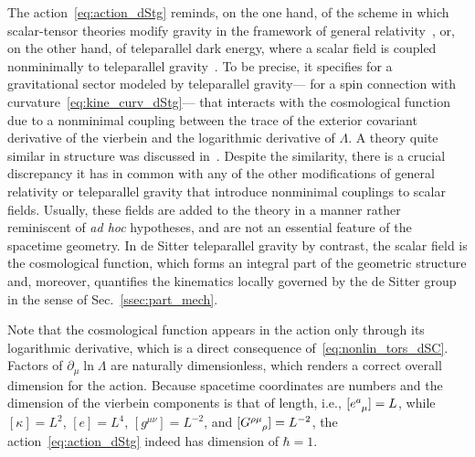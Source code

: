 \documentclass[%
aps,
prd,
reprint
]{revtex4-1}
\newcommand{\ind}{\indices}
\def\pd{\partial}
\begin{document}
The action~\eqref{eq:action_dStg} reminds, on the one hand, of 
the scheme in which scalar-tensor theories modify gravity in the 
framework of general relativity~\cite{Brans:1961sx, Dicke:1961gz, 
  Bergmann:1968ve, Sotiriou:2008rp, Tsujikawa:2010zza}, or, on 
the other hand, of teleparallel dark energy, where a scalar field 
is coupled nonminimally to teleparallel 
gravity~\cite{Geng:2011aj, Geng:2011ka, Xu:2012jf}. To be 
precise, it specifies for a gravitational sector modeled by 
teleparallel gravity--- for a spin connection with 
curvature~\eqref{eq:kine_curv_dStg}--- that interacts with the 
cosmological function due to a nonminimal coupling between the 
trace of the exterior covariant derivative of the vierbein and 
the logarithmic derivative of $\Lambda$. A theory quite similar 
in structure was discussed in~\cite{Otalora:2014aoa}. Despite the 
similarity, there is a crucial discrepancy it has in common with 
any of the other modifications of general relativity or 
teleparallel gravity that introduce nonminimal couplings to 
scalar fields. Usually, these fields are added to the theory in 
a manner rather reminiscent of \emph{ad hoc} hypotheses, and are 
not an essential feature of the spacetime geometry. In de Sitter 
teleparallel gravity by contrast, the scalar field is the 
cosmological function, which forms an integral part of the 
geometric structure and, moreover, quantifies the kinematics 
locally governed by the de Sitter group in the sense of 
Sec.~\ref{ssec:part_mech}. 

Note that the cosmological function appears in the action only 
through its logarithmic derivative, which is a direct consequence 
of~\eqref{eq:nonlin_tors_dSC}. Factors of $\pd_\mu \ln \Lambda$ 
are naturally dimensionless, which renders a correct overall 
dimension for the action. Because spacetime coordinates are 
numbers and the dimension of the vierbein components is that of 
length, i.e., $[e\ind{^a_\mu}] = L$, while $[\kappa] = L^2$, $[e] 
= L^4$, $[g^{\mu\nu}] = L^{-2}$, and $[G\ind{^{\rho\mu}_\rho}] 
= L^{-2}$, the action~\eqref{eq:action_dStg} indeed has dimension 
of $\hbar = 1$.
\end{document}
